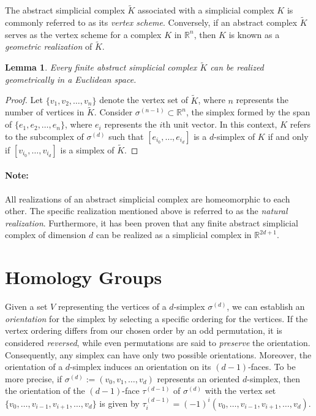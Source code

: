 \documentclass{amsart}
\newtheorem{lemma}[definition]{Lemma}
\begin{document}
The abstract simplicial complex $\tilde{K}$ associated with a simplicial complex $K$ is commonly referred to as its \emph{vertex scheme}. Conversely, if an abstract complex $\tilde{K}$ serves as the vertex scheme for a complex $K$ in $\mathbb{R}^n$, then $K$ is known as a \emph{geometric realization} of $\tilde{K}$.

\begin{lemma}
Every finite abstract simplicial complex $\tilde{K}$ can be realized geometrically in a Euclidean space.
\end{lemma}

\begin{proof}
Let $\{v_1,v_2, \ldots, v_n\}$ denote the vertex set of $\tilde{K}$, where $n$ represents the number of vertices in $\tilde{K}$. Consider $\sigma^{(n-1)} \subset \mathbb{R}^n$, the simplex formed by the span of $\{e_1, e_2, \ldots, e_n\}$, where $e_i$ represents the $i$th unit vector. In this context, $K$ refers to the subcomplex of $\sigma^{(d)}$ such that $[e_{i_0}, \ldots, e_{i_d}]$ is a $d$-simplex of $K$ if and only if $[v_{i_0}, \ldots, v_{i_d}]$ is a simplex of $\tilde{K}$.
\end{proof}

\paragraph{Note:}
All realizations of an abstract simplicial complex are homeomorphic to each other. The specific realization mentioned above is referred to as the \emph{natural realization}. Furthermore, it has been proven that any finite abstract simplicial complex of dimension $d$ can be realized as a simplicial complex in $\mathbb{R}^{2d+1}$.

\section{Homology Groups}
Given a set $V$ representing the vertices of a $d$-simplex $\sigma^{(d)}$, we can establish an \emph{orientation} for the simplex by selecting a specific ordering for the vertices. If the vertex ordering differs from our chosen order by an odd permutation, it is considered \emph{reversed}, while even permutations are said to \emph{preserve} the orientation. Consequently, any simplex can have only two possible orientations. Moreover, the orientation of a $d$-simplex induces an orientation on its $(d-1)$-faces. To be more precise, if $\sigma^{(d)} := (v_0, v_1, \ldots, v_d)$ represents an oriented $d$-simplex, then the orientation of the $(d-1)$-face $\tau^{(d-1)}$ of $\sigma^{(d)}$ with the vertex set $\{v_0,\ldots,v_{i-1},v_{i+1},\ldots,v_d\}$ is given by $\tau_i^{(d-1)} = (-1)^i (v_0, \ldots,v_{i-1},v_{i+1},\ldots,v_d)$.
\end{document}
